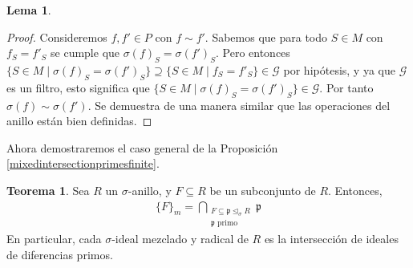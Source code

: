 \documentclass[letterpaper]{article}
\def\p{\mathfrak{p}}
\def\s{\sigma}
\def\si{\unlhd_{\sigma}}
\theoremstyle{definition}
\newtheorem{theorem}[Satz]{Teorema}
\newtheorem{lem}[Satz]{Lema}
\begin{document}
\begin{lem}
\begin{proof}
 Consideremos $f,f' \in P$ con $f \sim f'$. Sabemos que para todo $S \in M$ con $f_S = f'_S$ se cumple que   $\sigma(f)_S = \sigma(f')_S$. Pero entonces $\{ S \in M \mid \s(f)_S = \s(f')_S \} \supseteq \{ S \in M \mid f_S = f'_S \} \in \mathcal{G}$ por hip\'otesis, y ya que $\mathcal{G}$ es un filtro, esto significa que $\{ S \in M \mid \s(f)_S = \s(f')_S \} \in \mathcal{G}$.
 Por tanto $\s(f) \sim \s(f')$. Se demuestra de una manera similar que las operaciones del anillo est\'an bien definidas.
\end{proof}
\end{lem}

Ahora demostraremos el caso general de la Proposici\'on \ref{mixedintersectionprimesfinite}. 


\begin{theorem}\label{intersectionprimes}
Sea $R$ un $\sigma$-anillo, y $F \subseteq R$ be un subconjunto de $R$. Entonces, 
\begin{align*} \{F\}_m = \bigcap_{\substack{F \subseteq \p \si R \\ \p \text{ primo}}} \p \end{align*}
En particular, cada $\sigma$-ideal mezclado y radical de $R$ es la intersecci\'on de ideales de diferencias primos.
\end{theorem}
\end{document}
